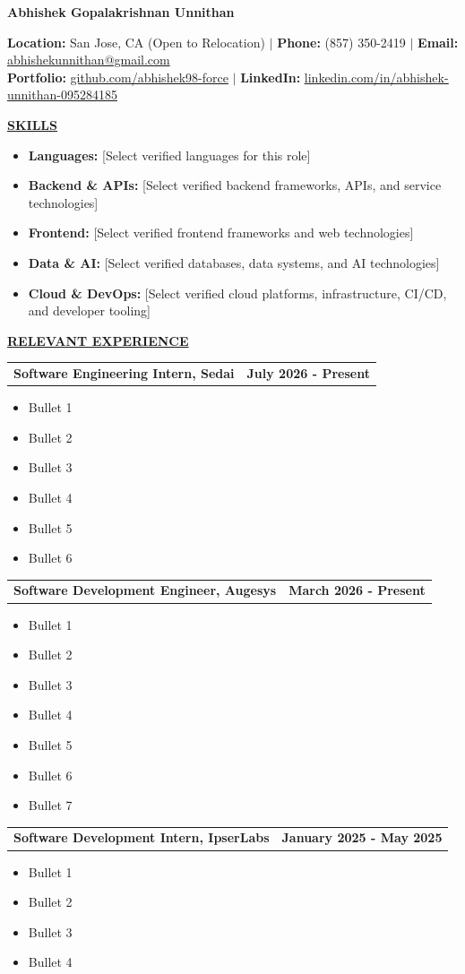 \documentclass[letterpaper,10pt]{article}
\makeatletter
\newcommand{\resumeSection}[1]{%
  \vspace{12.2bp}
  {\bfseries\underline{#1}}\par
}
\newcommand{\resumeSubheading}[2]{%
  \begin{tabular*}{\textwidth}{@{}l@{\extracolsep{\fill}}r@{}}
    \bfseries #1 & \bfseries #2
  \end{tabular*}\par
}
\newcommand{\resumeSubHeadingListStart}{\begingroup}
\newcommand{\resumeItemListStart}{%
  \begin{itemize}[
    leftmargin=36bp,
    labelindent=18.8bp,
    labelwidth=4.2bp,
    labelsep=13bp,
    topsep=0pt,
    partopsep=0pt,
    parsep=0pt,
    itemsep=0pt
  ]
}
\newcommand{\resumeItemListEnd}{\end{itemize}}
\newcommand{\resumeItem}[1]{\item #1}
\newcommand{\resumeSubItem}[2]{\resumeItem{\textbf{#1:} #2}}
\makeatother
\begin{document}
\fontsize{10bp}{12.2bp}\selectfont

\vspace*{0.9bp}
{\centering\fontsize{14bp}{17bp}\selectfont\bfseries
Abhishek Gopalakrishnan Unnithan\par}
\fontsize{10bp}{12.2bp}\selectfont

\begin{center}
  \textbf{Location:} San Jose, CA (Open to Relocation)
  \enspace $\vert$ \enspace
  \textbf{Phone:} (857) 350-2419
  \enspace $\vert$ \enspace
  \textbf{Email:} \href{mailto:abhishekunnithan@gmail.com}{abhishekunnithan@gmail.com} \\
  \textbf{Portfolio:} \href{https://github.com/abhishek98-force}{\underline{github.com/abhishek98-force}}
  \enspace $\vert$ \enspace
  \textbf{LinkedIn:} \href{https://linkedin.com/in/abhishek-unnithan-095284185/}{\underline{linkedin.com/in/abhishek-unnithan-095284185}}
\end{center}

\vspace{3.3bp}
\resumeSection{SKILLS}
\resumeItemListStart
  \resumeSubItem{Languages}{[Select verified languages for this role]}
  \resumeSubItem{Backend \& APIs}{[Select verified backend frameworks, APIs, and service technologies]}
  \resumeSubItem{Frontend}{[Select verified frontend frameworks and web technologies]}
  \resumeSubItem{Data \& AI}{[Select verified databases, data systems, and AI technologies]}
  \resumeSubItem{Cloud \& DevOps}{[Select verified cloud platforms, infrastructure, CI/CD, and developer tooling]}
\resumeItemListEnd

\resumeSection{RELEVANT EXPERIENCE}
\resumeSubHeadingListStart

\resumeSubheading{Software Engineering Intern, Sedai}{July 2026 - Present}
\resumeItemListStart
  \resumeItem{Bullet 1}
  \resumeItem{Bullet 2}
  \resumeItem{Bullet 3}
  \resumeItem{Bullet 4}
  \resumeItem{Bullet 5}
  \resumeItem{Bullet 6}
\resumeItemListEnd

\resumeSubheading{Software Development Engineer, Augesys}{March 2026 - Present}
\resumeItemListStart
  \resumeItem{Bullet 1}
  \resumeItem{Bullet 2}
  \resumeItem{Bullet 3}
  \resumeItem{Bullet 4}
  \resumeItem{Bullet 5}
  \resumeItem{Bullet 6}
  \resumeItem{Bullet 7}
\resumeItemListEnd

\resumeSubheading{Software Development Intern, IpserLabs}{January 2025 - May 2025}
\resumeItemListStart
  \resumeItem{Bullet 1}
  \resumeItem{Bullet 2}
  \resumeItem{Bullet 3}
  \resumeItem{Bullet 4}
\resumeItemListEnd
\end{document}
